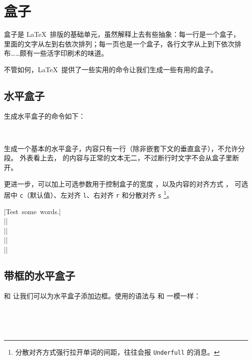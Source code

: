 \section{盒子}\label{sec:box}

盒子是 \LaTeX\ 排版的基础单元，虽然解释上去有些抽象：每一行是一个盒子，
里面的文字从左到右依次排列；每一页也是一个盒子，各行文字从上到下依次排布……颇有一些活字印刷术的味道。

不管如何，\LaTeX\ 提供了一些实用的命令让我们生成一些有用的盒子。

\subsection{水平盒子}\label{subsec:mbox}

生成水平盒子的命令如下：
\begin{command}
\marg*{\ldots} \\
\marg*{\ldots}
\end{command}

 生成一个基本的水平盒子，内容只有一行（除非嵌套下文的垂直盒子），不允许分段。
外表看上去， 的内容与正常的文本无二，不过断行时文字不会从盒子里断开。

 更进一步，可以加上可选参数用于控制盒子的宽度 ，以及内容的对齐方式 ，
可选居中 \texttt{c}（默认值）、左对齐 \texttt{l}、右对齐 \texttt{r} 和分散对齐 \texttt{s}%
\footnote{分散对齐方式强行拉开单词的间距，往往会报 \texttt{Underfull}  的消息。}。
\begin{example}
|\mbox{Test some words.}|\\
||\\
||\\
||\\
||
\end{example}

\subsection{带框的水平盒子}\label{subsec:fbox}

 和  让我们可以为水平盒子添加边框。使用的语法与  和  一模一样：
\begin{command}
\marg*{\ldots} \\
\marg*{\ldots}
\end{command}
\begin{example}
\\
\end{example}

